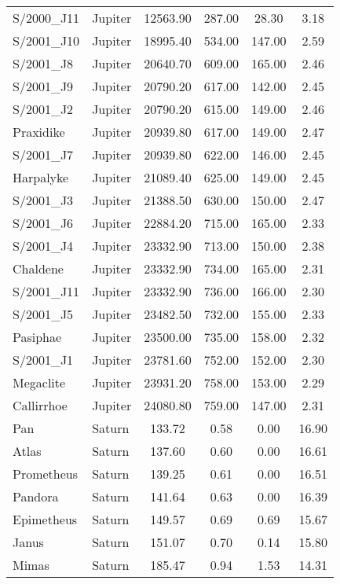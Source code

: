 \documentclass[a4paper,12pt]{scrartcl}
\begin{document}
\begin{longtable}{|l|l|S|S|S|S|}
  S/2000\_J11 &  Jupiter &  12563.90  & 287.00  & 28.30  & 3.18  \\
  S/2001\_J10 &  Jupiter &  18995.40  & 534.00  & 147.00  & 2.59  \\
  S/2001\_J8 &  Jupiter &  20640.70  & 609.00  & 165.00  & 2.46  \\
  S/2001\_J9 &  Jupiter &  20790.20  & 617.00  & 142.00  & 2.45  \\
  S/2001\_J2 &  Jupiter &  20790.20  & 615.00  & 149.00  & 2.46  \\
  Praxidike &  Jupiter &  20939.80  & 617.00  & 149.00  & 2.47  \\
  S/2001\_J7 &  Jupiter &  20939.80  & 622.00  & 146.00  & 2.45  \\
  Harpalyke &  Jupiter &  21089.40  & 625.00  & 149.00  & 2.45  \\
  S/2001\_J3 &  Jupiter &  21388.50  & 630.00  & 150.00  & 2.47  \\
  S/2001\_J6 &  Jupiter &  22884.20  & 715.00  & 165.00  & 2.33  \\
  S/2001\_J4 &  Jupiter &  23332.90  & 713.00  & 150.00  & 2.38  \\
  Chaldene &  Jupiter &  23332.90  & 734.00  & 165.00  & 2.31  \\
  S/2001\_J11 &  Jupiter &  23332.90  & 736.00  & 166.00  & 2.30  \\
  S/2001\_J5 &  Jupiter &  23482.50  & 732.00  & 155.00  & 2.33  \\
  Pasiphae &  Jupiter &  23500.00  & 735.00  & 158.00  & 2.32  \\
  S/2001\_J1 &  Jupiter &  23781.60  & 752.00  & 152.00  & 2.30  \\
  Megaclite &  Jupiter &  23931.20  & 758.00  & 153.00  & 2.29  \\
  Callirrhoe &  Jupiter &  24080.80  & 759.00  & 147.00  & 2.31  \\
  Pan &  Saturn &  133.72  & 0.58  & 0.00  & 16.90  \\
  Atlas &  Saturn &  137.60  & 0.60  & 0.00  & 16.61  \\
  Prometheus &  Saturn &  139.25  & 0.61  & 0.00  & 16.51  \\
  Pandora &  Saturn &  141.64  & 0.63  & 0.00  & 16.39  \\
  Epimetheus &  Saturn &  149.57  & 0.69  & 0.69  & 15.67  \\
  Janus &  Saturn &  151.07  & 0.70  & 0.14  & 15.80  \\
  Mimas &  Saturn &  185.47  & 0.94  & 1.53  & 14.31  \\

\end{longtable}
\end{document}
